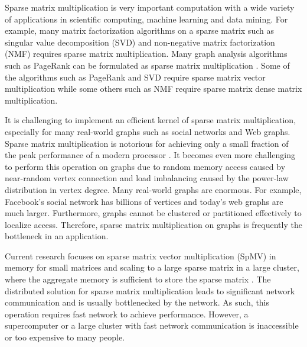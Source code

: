 Sparse matrix multiplication is very important computation with a wide variety
of applications in scientific computing, machine learning and data mining.
For example, many matrix factorization algorithms on a sparse matrix such as
singular value decomposition (SVD) \cite{svd} and non-negative matrix
factorization (NMF) \cite{nmf} requires sparse matrix multiplication.
Many graph analysis algorithms such as PageRank \cite{pagerank} can be
formulated as sparse matrix multiplication \cite{Mattson13}. Some of
the algorithms such as PageRank and SVD require sparse matrix vector
multiplication while some others such as NMF require sparse matrix dense
matrix multiplication.


It is challenging to implement an efficient kernel of sparse matrix
multiplication, especially for many real-world graphs such as social networks
and Web graphs. Sparse matrix multiplication is notorious for achieving only
a small fraction of the peak performance of a modern processor \cite{Williams07}.
It becomes even more challenging to perform this operation on graphs due to
random memory access caused by near-random vertex connection and load imbalancing
caused by the power-law distribution in vertex degree. Many real-world graphs
are enormous. For example, Facebook's social network has billions of vertices
and today's web graphs are much larger. Furthermore, graphs cannot be
clustered or partitioned effectively \cite{leskovec} to localize access.
Therefore, sparse matrix multiplication on graphs is frequently the bottleneck
in an application.

Current research focuses on sparse matrix vector multiplication (SpMV) in memory
for small matrices and scaling to a large sparse matrix in a large cluster,
where the aggregate memory is sufficient to store the sparse matrix
\cite{Williams07, Yoo11, Boman2013}.
The distributed solution for sparse matrix multiplication leads to significant
network communication and is usually bottlenecked by the network.
As such, this operation requires fast network to achieve performance.
However, a supercomputer or a large cluster with fast network communication
is inaccessible or too expensive to many people.



